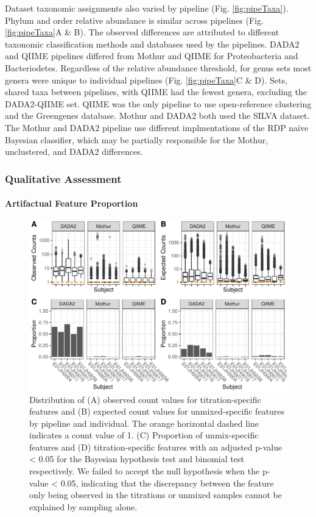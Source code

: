 \documentclass[linenumbers]{bmcart}
\begin{document}
Dataset taxonomic assignments also varied by pipeline (Fig.
\ref{fig:pipeTaxa}). Phylum and order relative abundance is similar
across pipelines (Fig. \ref{fig:pipeTaxa}A \& B). The observed
differences are attributed to different taxonomic classification methods
and databases used by the pipelines. DADA2 and QIIME pipelines differed
from Mothur and QIIME for Proteobacteria and Bacteriodetes. Regardless
of the relative abundance threshold, for genus sets most genera were
unique to individual pipelines (Fig. \ref{fig:pipeTaxa}C \& D). Sets,
shared taxa between pipelines, with QIIME had the fewest genera,
excluding the DADA2-QIIME set. QIIME was the only pipeline to use
open-reference clustering and the Greengenes database. Mothur and DADA2
both used the SILVA dataset. The Mothur and DADA2 pipeline use different
implmentations of the RDP naïve Bayesian classifier, which may be
partially responsible for the Mothur, unclustered, and DADA2
differences.

\subsubsection*{Qualitative Assessment}

\paragraph{Artifactual Feature Proportion}

\begin{figure}
\centering
\includegraphics{qualPlot-1.pdf}
\caption{\label{fig:qualPlot}Distribution of (A) observed count values for
titration-specific features and (B) expected count values for
unmixed-specific features by pipeline and individual. The orange
horizontal dashed line indicates a count value of 1. (C) Proportion of
unmix-specific features and (D) titration-specific features with an
adjusted p-value \textless{} 0.05 for the Bayesian hypothesis test and
binomial test respectively. We failed to accept the null hypothesis when
the p-value \textless{} 0.05, indicating that the discrepancy between
the feature only being observed in the titrations or unmixed samples
cannot be explained by sampling alone.}
\end{figure}
\end{document}
